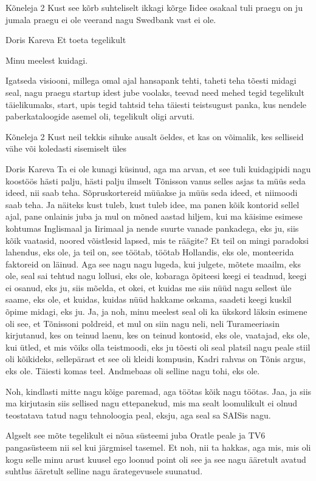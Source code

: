 Kõneleja 2
Kust see kõrb suhteliselt ikkagi kõrge Iidee osakaal tuli praegu on ju jumala praegu ei ole veerand nagu Swedbank vast ei ole. 

Doris Kareva
Et toeta tegelikult 

Minu meelest kuidagi. 

Igatseda visiooni, millega omal ajal hansapank tehti, taheti teha tõesti midagi seal, nagu praegu startup idest jube voolaks, teevad need mehed tegid tegelikult täielikumaks, start, upis tegid tahtsid teha täiesti teistsugust panka, kus nendele paberkataloogide asemel oli, tegelikult oligi arvuti. 

Kõneleja 2
Kust neil tekkis sihuke ausalt öeldes, et kas on võimalik, kes selliseid vähe või koledasti sisemiselt üles 

Doris Kareva
Ta ei ole kunagi küsinud, aga ma arvan, et see tuli kuidagipidi nagu koostöös hästi palju, hästi palju ilmselt Tõnisson vanus selles asjas ta müüs seda ideed, nii saab teha. Sõpruskortereid müüakse ja müüs seda ideed, et niimoodi saab teha. Ja näiteks kust tuleb, kust tuleb idee, ma panen kõik kontorid sellel ajal, pane onlainis juba ja mul on mõned aastad hiljem, kui ma käisime esimese kohtumas Inglismaal ja Iirimaal ja nende suurte vanade pankadega, eks ju, siis kõik vaatasid, noored võistlesid lapsed, mis te räägite? Et teil on mingi paradoksi lahendus, eks ole, ja teil on, see töötab, töötab Hollandis, eks ole, monteerida faktoreid on läinud. Aga see nagu nagu lugeda, kui julgete, mõtete maailm, eks ole, seal sai tehtud nagu lollusi, eks ole, kobaraga õpiteesi keegi ei teadnud, keegi ei osanud, eks ju, siis mõelda, et okei, et kuidas me siis nüüd nagu sellest üle saame, eks ole, et kuidas, kuidas nüüd hakkame oskama, saadeti keegi kuskil õpime midagi, eks ju. Ja, ja noh, minu meelest seal oli ka ükskord läksin esimene oli see, et Tõnissoni poldreid, et mul on siin nagu neli, neli Turameeriasin kirjutanud, kes on teinud laenu, kes on teinud kontosid, eks ole, vaatajad, eks ole, kui ütled, et mis võiks olla teistmoodi, eks ju tõesti oli seal platsil nagu peale stiil oli kõikideks, sellepärast et see oli kleidi kompusin, Kadri rahvas on Tõnis argus, eks ole. Täiesti komas teel. Andmebaas oli selline nagu tohi, eks ole. 

Noh, kindlasti mitte nagu kõige paremad, aga töötas kõik nagu töötas. Jaa, ja siis ma kirjutasin siis sellised nagu ettepanekud, mis ma sealt loomulikult ei olnud teostatava tatud nagu tehnoloogia peal, eksju, aga seal sa SAISis nagu. 

Algselt see mõte tegelikult ei nõua süsteemi juba Oratle peale ja TV6 pangasüsteem nii sel kui järgmisel tasemel. Et noh, nii ta hakkas, aga mis, mis oli kogu selle minu arust kuusel ego loonud point oli see ja see nagu ääretult avatud suhtlus ääretult selline nagu ärategevusele suunatud. 

